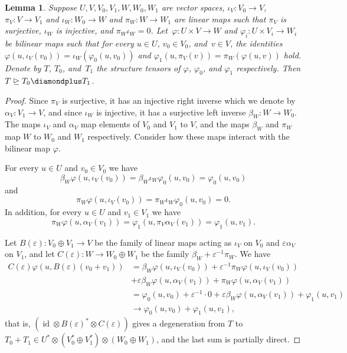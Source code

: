 \documentclass[11pt,letterpaper]{article}
\newtheorem{lemma}[theorem]{Lemma}\AddToHook{env/lemma/begin}{\crefalias{theorem}{lemma}}
\numberwithin{equation}{section}
\begin{document}
\begin{lemma}\label{lem:degeneration-sequences}
    Suppose $U, V, V_0, V_1, W, W_0, W_1$ are vector spaces, $\iota_V \colon V_0 \to V$, $\pi_V \colon V \to V_1$ and $\iota_W \colon W_0 \to W$ and $\pi_W \colon W \to W_1$ are linear maps such that $\pi_V$ is surjective, $\iota_W$ is injective, and $\pi_W \iota_W = 0$.
    Let~$\varphi \colon U \times V \to W$ and $\varphi_i \colon U \times V_i \to W_i$ be bilinear maps such that for every $u \in U$, $v_0 \in V_0$, and~$v \in V$, the identities $\varphi(u, \iota_V(v_0)) = \iota_W(\varphi_0(u, v_0))$ and $\varphi_1(u, \pi_V(v)) = \pi_W(\varphi(u, v))$ hold.
    Denote by $T$, $T_0$, and~$T_1$ the structure tensors of $\varphi$, $\varphi_0$, and $\varphi_1$ respectively. Then
    $T \trianglerighteq T_0 \diamondplus T_1$.
\end{lemma}
\begin{proof}
  Since $\pi_V$ is surjective, it has an injective right inverse which we denote by $\alpha_V \colon V_1 \to V$, and since $\iota_W$ is injective, it has a surjective left inverse $\beta_W \colon W \to W_0$.
  The maps $\iota_V$ and $\alpha_V$ map elements of $V_0$ and $V_1$ to $V$, and the maps $\beta_W$ and $\pi_W$ map $W$ to $W_0$ and $W_1$ respectively.
  Consider how these maps interact with the bilinear map $\varphi$.

  For every $u \in U$ and $v_0 \in V_0$ we have
  \[\beta_W \varphi(u, \iota_V(v_0)) = \beta_W \iota_W \varphi_0(u, v_0) = \varphi_0(u, v_0)\]
  and
  \[\pi_W \varphi(u, \iota_V(v_0)) = \pi_W \iota_W \varphi_0(u, v_0) = 0.\]
  In addition, for every $u \in U$ and $v_1 \in V_1$ we have
  \[\pi_W \varphi(u, \alpha_V(v_1)) = \varphi_1(u, \pi_V \alpha_V(v_1)) = \varphi_1(u, v_1).\]

  Let $B(\varepsilon) \colon V_0 \oplus V_1 \to V$ be the family of linear maps acting as $\iota_V$ on $V_0$ and $\varepsilon \alpha_V$ on $V_1$, and let $C(\varepsilon) \colon W \to W_0 \oplus W_1$ be the family $\beta_W + \varepsilon^{-1} \pi_W$.
  We have
  \begin{align*}
    C(\varepsilon) \varphi(u, B(\varepsilon)(v_0 + v_1))
    & = \beta_W \varphi(u, \iota_V(v_0)) + \varepsilon^{-1} \pi_W \varphi(u, \iota_V (v_0)) \\& + \varepsilon \beta_W \varphi(u, \alpha_V(v_1)) + \pi_W \varphi(u, \alpha_V(v_1))\\
    & = \varphi_0(u, v_0) + \varepsilon^{-1} \cdot 0 + \varepsilon \beta_W \varphi(u, \alpha_V(v_1)) + \varphi_1(u, v_1) \\
    &\rightarrow \varphi_0(u, v_0) + \varphi_1(u, v_1),
  \end{align*}
    that is, $(\operatorname{id} \otimes B(\varepsilon)^* \otimes C(\varepsilon))$ gives a degeneration from $T$ to $T_0 + T_1 \in U^* \otimes (V_0^* \oplus V_1^*) \otimes (W_0 \oplus W_1)$, and the last sum is partially direct.
\end{proof}
\end{document}
